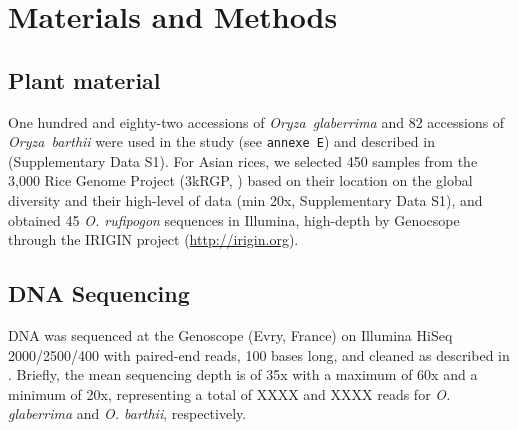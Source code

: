 \documentclass[10pt,letterpaper]{article}
\begin{document}
% 
% 

\section*{Materials and Methods}

 \subsection*{Plant material}
  One hundred and eighty-two accessions of \emph{Oryza~glaberrima} and 82 accessions of \emph{Oryza~barthii} were used in the study (see \texttt{annexe E}) and described in \cite{Cubry2018} (Supplementary Data S1). For Asian rices, we selected 450 samples from the 3,000 Rice Genome Project (3kRGP, \cite{3kRGP}) based on their location on the global diversity and their high-level of data (min 20x, Supplementary Data S1), and obtained 45 \textit{O. rufipogon} sequences in Illumina, high-depth by Genocsope through the IRIGIN project (\url{http://irigin.org}). 
  
  \subsection*{DNA Sequencing}
  DNA was sequenced at the Genoscope (Evry, France) on Illumina HiSeq 2000/2500/400 with paired-end reads, 100 bases long, and cleaned as described in \cite{Cubry2018, Djedatin2017}. Briefly, the mean sequencing depth is of 35x with a maximum of 60x and a minimum of 20x, representing a total of XXXX and XXXX reads for \textit{O. glaberrima} and \textit{O. barthii}, respectively.
\end{document}
